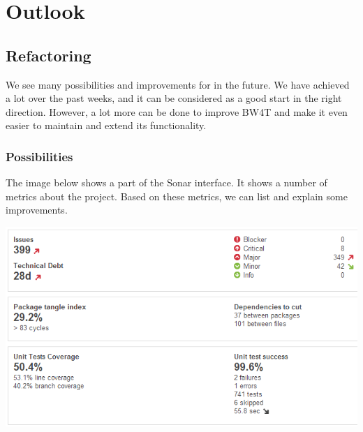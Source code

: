 \chapter{Outlook}

\section{Refactoring}
We see many possibilities and improvements for in the future. We have achieved a lot over the past weeks, and it can be considered as a good start in the right direction. However, a lot more can be done to improve BW4T and make it even easier to maintain and extend its functionality. 

\subsection*{Possibilities}
The image below shows a part of the Sonar interface. It shows a number of metrics about the project. Based on these metrics, we can list and explain some improvements.

\includegraphics[scale=0.5]{pictures/statistics_group1}

